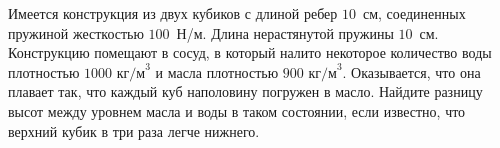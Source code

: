 Имеется конструкция из двух кубиков с длиной ребер $10$~см, соединенных пружиной жесткостью $100$~Н/м. Длина нерастянутой пружины $10$~см. Конструкцию помещают в сосуд, в который налито некоторое количество воды плотностью $1000\text{ кг/м}^3$ и масла плотностью $900\text{ кг/м}^3$. Оказывается, что она плавает так, что каждый куб наполовину погружен в масло. Найдите разницу высот между уровнем масла и воды в таком состоянии, если известно, что верхний кубик в три раза легче нижнего.